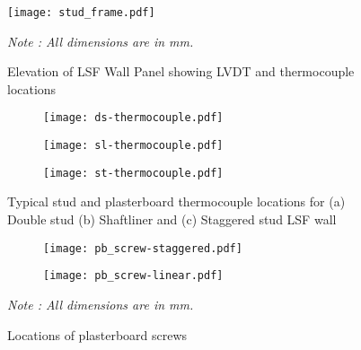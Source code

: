 \begin{figure}[!htbp]
	\centering
		\texttt{[image: stud\_frame.pdf]}
		\caption{Elevation of LSF Wall Panel showing LVDT and thermocouple locations}
		\label{fig:ds-elevation}
		\fontsize{10}{1}\textit{Note : All dimensions are in mm.}
\end{figure}
\begin{figure}[!htbp]
	\centering
	\begin{subfigure}[b]{0.5\textwidth}
		\centering
		\texttt{[image: ds-thermocouple.pdf]}
		\caption{}
		\label{subfig:ds-section}
	\end{subfigure}
	\begin{subfigure}[b]{0.5\textwidth}
		\centering
		\texttt{[image: sl-thermocouple.pdf]}
		\caption{}
		\label{subfig:sl-section}
	\end{subfigure}
	\begin{subfigure}[b]{0.6\textwidth}
		\centering
		\texttt{[image: st-thermocouple.pdf]}
		\caption{}
		\label{subfig:st-section}
	\end{subfigure}
	   \caption{Typical stud and plasterboard thermocouple locations for (a) Double stud (b) Shaftliner and (c) Staggered stud LSF wall}
	   \label{fig:typical-thermocouple}
\end{figure}
\begin{figure}[!htbp]
	\centering
	\begin{subfigure}[b]{0.3\textwidth}
		\centering
		\texttt{[image: pb\_screw-staggered.pdf]}
		\caption{}
		\label{subfig:pb_screw-staggered}
	\end{subfigure}
	\begin{subfigure}[b]{0.3\textwidth}
		\centering
		\texttt{[image: pb\_screw-linear.pdf]}
		\caption{}
		\label{subfig:pb_screw-linear}
	\end{subfigure}
	   \caption{Locations of plasterboard screws}
	   \label{fig:screw}
	   \fontsize{10}{1}\textit{Note : All dimensions are in mm.}
\end{figure}


